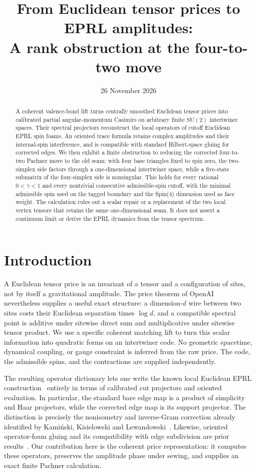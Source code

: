\documentclass[11pt]{article}
\title{\textbf{From Euclidean tensor prices to EPRL amplitudes:}\\[2pt]
A rank obstruction at the four-to-two move}
\author{}
\date{26 November 2026}
\theoremstyle{remark}
\begin{document}
\maketitle
\begin{abstract}
A coherent valence-bond lift turns centrally smoothed Euclidean tensor prices into calibrated partial angular-momentum Casimirs on arbitrary finite \(\mathrm{SU}(2)\) intertwiner spaces. Their spectral projectors reconstruct the local operators of cutoff Euclidean EPRL spin foams. An oriented trace formula retains complex amplitudes and their internal-spin interference, and is compatible with standard Hilbert-space gluing for corrected edges. We then exhibit a finite obstruction to reducing the corrected four-to-two Pachner move to the old seam: with four base triangles fixed to spin zero, the two-simplex side factors through a one-dimensional intertwiner space, while a five-state submatrix of the four-simplex side is nonsingular. This holds for every rational \(0<\gamma<1\) and every nontrivial consecutive admissible-spin cutoff, with the minimal admissible spin used on the tagged boundary and the Spin(4) dimension used as face weight. The calculation rules out a scalar repair or a replacement of the two local vertex tensors that retains the same one-dimensional seam. It does not assert a continuum limit or derive the EPRL dynamics from the tensor spectrum.
\end{abstract}

\section{Introduction}

A Euclidean tensor price is an invariant of a tensor and a configuration of sites, not by itself a gravitational amplitude. The price theorem of OpenAI~\cite{OpenAI} nevertheless supplies a useful exact structure: a dimension-\(d\) wire between two sites costs their Euclidean separation times \(\log d\), and a compatible spectral point is additive under sitewise direct sum and multiplicative under sitewise tensor product. We use a specific coherent matching lift to turn this scalar information into quadratic forms on an intertwiner code. No geometric spacetime, dynamical coupling, or gauge constraint is inferred from the raw price. The code, the admissible spins, and the contractions are supplied independently.

The resulting operator dictionary lets one write the known local Euclidean EPRL construction~\cite{EPRL,Barrett} entirely in terms of calibrated cut projectors and oriented evaluation. In particular, the standard bare edge map is a product of simplicity and Haar projectors, while the corrected edge map is its support projector. The distinction is precisely the nonisometry and inverse-Gram correction already identified by Kami\'nski, Kisielowski and Lewandowski~\cite{KKL}. Likewise, oriented operator-foam gluing and its compatibility with edge subdivision are prior results~\cite{Operator}. Our contribution here is the coherent price representation: it computes these operators, preserves the amplitude phase under sewing, and supplies an exact finite Pachner calculation.
\end{document}
